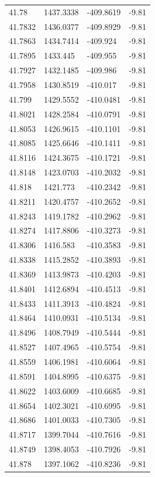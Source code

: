 \begin{table}[H]
\begin{tabular}{llll}
41.78 & 1437.3338 & -409.8619 & -9.81 \\
41.7832 & 1436.0377 & -409.8929 & -9.81 \\
41.7863 & 1434.7414 & -409.924 & -9.81 \\
41.7895 & 1433.445 & -409.955 & -9.81 \\
41.7927 & 1432.1485 & -409.986 & -9.81 \\
41.7958 & 1430.8519 & -410.017 & -9.81 \\
41.799 & 1429.5552 & -410.0481 & -9.81 \\
41.8021 & 1428.2584 & -410.0791 & -9.81 \\
41.8053 & 1426.9615 & -410.1101 & -9.81 \\
41.8085 & 1425.6646 & -410.1411 & -9.81 \\
41.8116 & 1424.3675 & -410.1721 & -9.81 \\
41.8148 & 1423.0703 & -410.2032 & -9.81 \\
41.818 & 1421.773 & -410.2342 & -9.81 \\
41.8211 & 1420.4757 & -410.2652 & -9.81 \\
41.8243 & 1419.1782 & -410.2962 & -9.81 \\
41.8274 & 1417.8806 & -410.3273 & -9.81 \\
41.8306 & 1416.583 & -410.3583 & -9.81 \\
41.8338 & 1415.2852 & -410.3893 & -9.81 \\
41.8369 & 1413.9873 & -410.4203 & -9.81 \\
41.8401 & 1412.6894 & -410.4513 & -9.81 \\
41.8433 & 1411.3913 & -410.4824 & -9.81 \\
41.8464 & 1410.0931 & -410.5134 & -9.81 \\
41.8496 & 1408.7949 & -410.5444 & -9.81 \\
41.8527 & 1407.4965 & -410.5754 & -9.81 \\
41.8559 & 1406.1981 & -410.6064 & -9.81 \\
41.8591 & 1404.8995 & -410.6375 & -9.81 \\
41.8622 & 1403.6009 & -410.6685 & -9.81 \\
41.8654 & 1402.3021 & -410.6995 & -9.81 \\
41.8686 & 1401.0033 & -410.7305 & -9.81 \\
41.8717 & 1399.7044 & -410.7616 & -9.81 \\
41.8749 & 1398.4053 & -410.7926 & -9.81 \\
41.878 & 1397.1062 & -410.8236 & -9.81 \\

\end{tabular}
\end{table}
